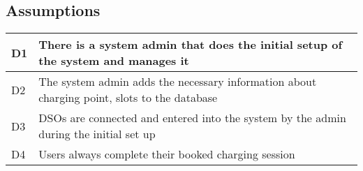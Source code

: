 \subsection{Assumptions}
\begin{tabular}{|l|l|}
	\hline
	D1 & There is a system admin that does the initial setup of the system and manages it \\
	\hline
	D2 & The system admin adds the necessary information about charging point, slots to the database \\
	\hline
	D3 & DSOs are connected and entered into the system by the admin during the initial set up\\
	\hline
	D4 & Users always complete their booked charging session\\
	\hline
\end{tabular}
